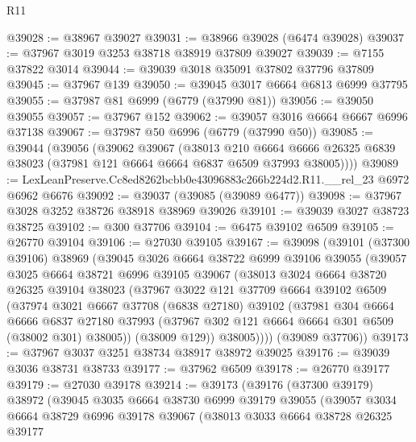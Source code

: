 \begin{lexlean}{R11}
\begin{coremodule}
@39028 := @38967 @39027
@39031 := @38966 @39028 (@6474 @39028)
@39037 := @37967 @3019 @3253 @38718 @38919 @37809 @39027
@39039 := @7155 @37822 @3014
@39044 := @39039 @3018 @35091 @37802 @37796 @37809
@39045 := @37967 @139
@39050 := @39045 @3017 @6664 @6813 @6999 @37795
@39055 := @37987 @81 @6999 (@6779 (@37990 @81))
@39056 := @39050 @39055
@39057 := @37967 @152
@39062 := @39057 @3016 @6664 @6667 @6996 @37138
@39067 := @37987 @50 @6996 (@6779 (@37990 @50))
@39085 := @39044
    (@39056
      (@39062
        @39067
        (@38013
          @210
          @6664
          @6666
          @26325
          @6839
          @38023
          (@37981 @121 @6664 @6664 @6837 @6509 @37993 @38005))))
@39089 := LexLeanPreserve.Cc8ed8262bcbb0e43096883c266b224d2.R11.__rel_23 @6972 @6962 @6676
@39092 := @39037 (@39085 (@39089 @6477))
@39098 := @37967 @3028 @3252 @38726 @38918 @38969 @39026
@39101 := @39039 @3027 @38723 @38725
@39102 := @300 @37706
@39104 := @6475 @39102 @6509
@39105 := @26770 @39104
@39106 := @27030 @39105
@39167 := @39098
    (@39101
      (@37300 @39106)
      @38969
      (@39045
        @3026
        @6664
        @38722
        @6999
        @39106
        @39055
        (@39057
          @3025
          @6664
          @38721
          @6996
          @39105
          @39067
          (@38013
            @3024
            @6664
            @38720
            @26325
            @39104
            @38023
            (@37967
              @3022
              @121
              @37709
              @6664
              @39102
              @6509
              (@37974
                @3021
                @6667
                @37708
                (@6838 @27180)
                @39102
                (@37981
                  @304
                  @6664
                  @6666
                  @6837
                  @27180
                  @37993
                  (@37967 @302 @121 @6664 @6664 @301 @6509 (@38002 @301) @38005))
                (@38009 @129))
              @38005))))
      (@39089 @37706))
@39173 := @37967 @3037 @3251 @38734 @38917 @38972 @39025
@39176 := @39039 @3036 @38731 @38733
@39177 := @37962 @6509
@39178 := @26770 @39177
@39179 := @27030 @39178
@39214 := @39173
    (@39176
      (@37300 @39179)
      @38972
      (@39045
        @3035
        @6664
        @38730
        @6999
        @39179
        @39055
        (@39057
          @3034
          @6664
          @38729
          @6996
          @39178
          @39067
          (@38013
            @3033
            @6664
            @38728
            @26325
            @39177

\end{coremodule}
\end{lexlean}

